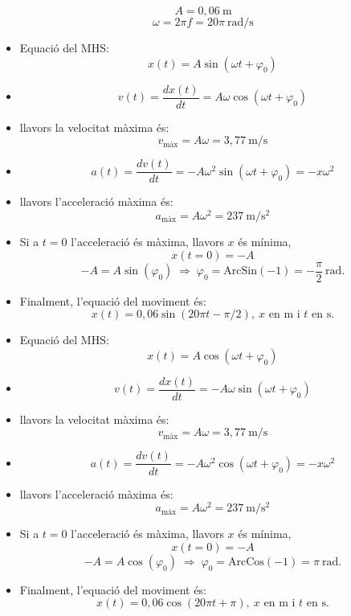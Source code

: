 \begin{solapartat}
\[ A = 0,06\ \mathrm{m} \]
\[ \omega = 2\pi f = 20\pi\ \mathrm{rad/s} \]


\begin{itemize}[leftmargin=2em,label={}]
\item {} Equació del MHS:
\[ x(t) = A\sin(\omega t + \varphi_0) \]

\item {}
\[ v(t) = \frac{dx(t)}{dt} = A\omega\cos(\omega t + \varphi_0) \]

\item {} llavors la velocitat màxima és:
\[ v_{\text{màx}} = A\omega = 3,77\ \mathrm{m/s} \]

\item {}
\[ a(t) = \frac{dv(t)}{dt} = -A\omega^2\sin(\omega t + \varphi_0) = -x\omega^2 \]

\item {} llavors l'acceleració màxima és:
\[ a_{\text{màx}} = A\omega^2 = 237\ \mathrm{m/s^2} \]

\item {} Si a $t=0$ l'acceleració és màxima, llavors $x$ és mínima,
\[ x(t=0) = -A \]
\[ -A = A\sin(\varphi_0) \;\Rightarrow\; \varphi_0 = \mathrm{ArcSin}(-1) = -\frac{\pi}{2}\ \mathrm{rad}. \]

\item {} Finalment, l'equació del moviment és:
\[ x(t) = 0,06\sin(20\pi t - \pi/2),\ \text{$x$ en m i $t$ en s.} \]
\end{itemize}


\begin{itemize}[leftmargin=2em,label={}]
\item {} Equació del MHS:
\[ x(t) = A\cos(\omega t + \varphi_0) \]

\item {}
\[ v(t) = \frac{dx(t)}{dt} = -A\omega\sin(\omega t + \varphi_0) \]

\item {} llavors la velocitat màxima és:
\[ v_{\text{màx}} = A\omega = 3,77\ \mathrm{m/s} \]

\item {}
\[ a(t) = \frac{dv(t)}{dt} = -A\omega^2\cos(\omega t + \varphi_0) = -x\omega^2 \]

\item {} llavors l'acceleració màxima és:
\[ a_{\text{màx}} = A\omega^2 = 237\ \mathrm{m/s^2} \]

\item {} Si a $t=0$ l'acceleració és màxima, llavors $x$ és mínima,
\[ x(t=0) = -A \]
\[ -A = A\cos(\varphi_0) \;\Rightarrow\; \varphi_0 = \mathrm{ArcCos}(-1) = \pi\ \mathrm{rad}. \]

\item {} Finalment, l'equació del moviment és:
\[ x(t) = 0,06\cos(20\pi t + \pi),\ \text{$x$ en m i $t$ en s.} \]
\end{itemize}
\end{solapartat}

